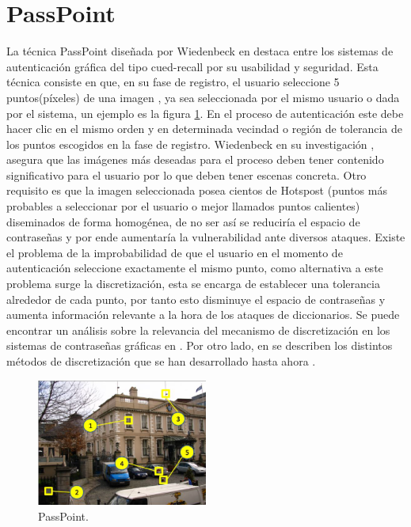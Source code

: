 \documentclass[12pt]{report}
\begin{document}
\section{PassPoint}
	La técnica PassPoint diseñada por Wiedenbeck en \cite{1} destaca entre los sistemas de autenticación gráfica del tipo cued-recall por su usabilidad y seguridad.
	Esta técnica consiste en que, en su fase de registro, el
	usuario seleccione 5 puntos(píxeles) de una imagen , ya sea seleccionada por el mismo usuario o dada por el sistema, un ejemplo es la figura \ref{fig:PassPoint}. En el proceso de autenticación este debe hacer clic en el mismo orden y en determinada  vecindad o región de tolerancia de los puntos escogidos en la fase de registro.
	Wiedenbeck en su investigación \cite{1}, asegura que las imágenes más deseadas para el proceso deben tener contenido significativo para el usuario por lo que deben tener escenas concreta. Otro requisito es que la imagen seleccionada posea cientos de Hotspost (puntos más probables a seleccionar por el usuario o mejor llamados puntos calientes) diseminados de forma homogénea, de no ser así se reduciría el espacio de contraseñas y por ende aumentaría la vulnerabilidad ante diversos ataques. Existe el problema de la improbabilidad de que el usuario en el momento de autenticación  seleccione exactamente el mismo punto, como alternativa a este problema surge la discretización, esta se encarga de establecer una tolerancia alrededor de cada punto, por tanto esto disminuye el espacio de contraseñas y aumenta información relevante a la hora de los ataques de diccionarios. Se puede encontrar un análisis sobre la relevancia del mecanismo de discretización en los sistemas de contraseñas gráficas en \cite{14,15,16}. Por otro lado, en \cite{14,15,16,17} se describen los distintos métodos de discretización que se han desarrollado hasta ahora .
	\begin{figure}[ht]
		\centering
		\includegraphics[width=0.5\textwidth]{passpoint.png}
		\caption{PassPoint.}
		\label{fig:PassPoint}
	\end{figure}
	
\end{document}
